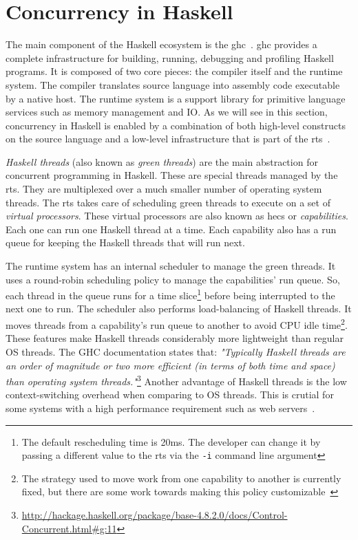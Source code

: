 \section{Concurrency in Haskell}\label{sec:haskell-conc}
The main component of the Haskell ecosystem is the \ac{ghc}~\cite{smpj:1993}. \acs{ghc} provides a complete infrastructure for building, running, debugging and profiling Haskell programs. It is composed of two core pieces: the compiler itself and the runtime system. The compiler translates source language into assembly code executable by a native host. The runtime system is a support library for primitive language services such as memory management and IO. As we will see in this section, concurrency in Haskell is enabled by a combination of both high-level constructs on the source language and a low-level infrastructure that is part of the \ac{rts}~\cite{li:2007}.

\emph{Haskell threads} (also known as \emph{green threads}) are the main abstraction for concurrent programming in Haskell. These are special threads managed by the \acl{rts}. They are multiplexed over a much smaller number of operating system threads. The \ac{rts} takes care of scheduling green threads to execute on a set of \emph{virtual processors}. These virtual processors are also known as \acp{hec} or \emph{capabilities}. Each one can run one Haskell thread at a time. Each capability also has a run queue for keeping the Haskell threads that will run next.

The runtime system has an internal scheduler to manage the green threads. It uses a round-robin scheduling policy to manage the capabilities' run queue. So, each thread in the queue runs for a time slice\footnote{The default rescheduling time is 20ms. The developer can change it by passing a different value to the \ac{rts} via the \texttt{-i} command line argument} before being interrupted to the next one to run. The scheduler also performs load-balancing of Haskell threads. It moves threads from a capability's run queue to another to avoid CPU idle time\footnote{The strategy used to move work from one capability to another is currently fixed, but there are some work towards making this policy customizable~\cite{siva:2014}}. These features make Haskell threads considerably more lightweight than regular OS threads. The GHC documentation states that: \emph{"Typically Haskell threads are an order of magnitude or two more efficient (in terms of both time and space) than operating system threads."}\footnote{\url{http://hackage.haskell.org/package/base-4.8.2.0/docs/Control-Concurrent.html\#g:11}} Another advantage of Haskell threads is the low context-switching overhead when comparing to OS threads. This is crutial for some systems with a high performance requirement such as web servers~\cite{voellmy:2013}.

